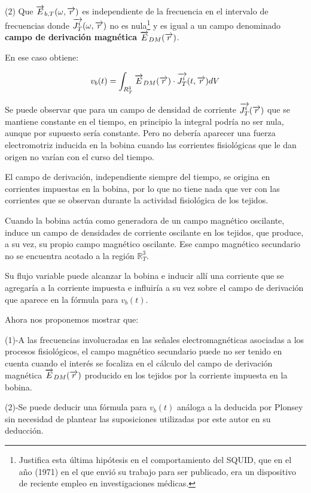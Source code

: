 (2) Que $\overrightarrow{E}_{b,T}(\omega,\overrightarrow{r})$ es independiente de la frecuencia en el intervalo de frecuencias donde $\overrightarrow{J_{T}^{i}}(\omega,\overrightarrow{r})$ no es nula\footnote{Justifica esta última hipótesis en el comportamiento del SQUID, que en el año (1971) en el que envió su trabajo para ser publicado, era un dispositivo de reciente empleo en investigaciones médicas.} y es igual a un campo denominado \textbf{campo de derivación magnética} $\overrightarrow{E}_{DM}(\overrightarrow{r})$.

En ese caso obtiene:

\begin{equation}
	v_{b}(t) =  \int_{R_{T}^{3}} \overrightarrow{E}_{DM}(\overrightarrow{r}) \cdot \overrightarrow{J_{T}^{i}}(t,\overrightarrow{r}) dV 
\end{equation}



Se puede observar que para un campo de densidad de corriente $\overrightarrow{J_{T}^{i}}(\overrightarrow{r})$ que se mantiene constante en el tiempo, en principio la integral podría no ser nula, aunque por supuesto sería constante. Pero no debería aparecer una fuerza electromotriz inducida en la bobina cuando las corrientes fisiológicas que le dan origen no varían con el curso del tiempo.

El campo de derivación, independiente siempre del tiempo, se origina en corrientes impuestas en la bobina, por lo que no tiene nada que ver con las corrientes que se observan durante la actividad fisiológica de los tejidos.

Cuando la bobina actúa como generadora de un campo magnético oscilante, induce un campo de densidades de corriente oscilante en los tejidos, que produce, a su vez, su propio campo magnético oscilante. Ese campo magnético secundario no se encuentra acotado a la región $\mathbb{R}^{3}_{T}$.

Su flujo variable puede alcanzar la bobina e inducir allí una corriente que se agregaría a la corriente impuesta e influiría a su vez sobre el campo de derivación que aparece en la fórmula para $v_{b}(t)$.

Ahora nos proponemos mostrar que:

(1)-A las frecuencias involucradas en las señales electromagnéticas asociadas a los procesos fisiológicos, el campo magnético secundario puede no ser tenido en cuenta cuando el interés se focaliza en el cálculo del campo de derivación magnética $\overrightarrow{E}_{DM}(\overrightarrow{r})$ producido en los tejidos por la corriente impuesta en la bobina.

(2)-Se puede deducir una fórmula para $v_{b}(t)$ análoga a la deducida por Plonsey sin necesidad de plantear las suposiciones utilizadas por este autor en su deducción.

